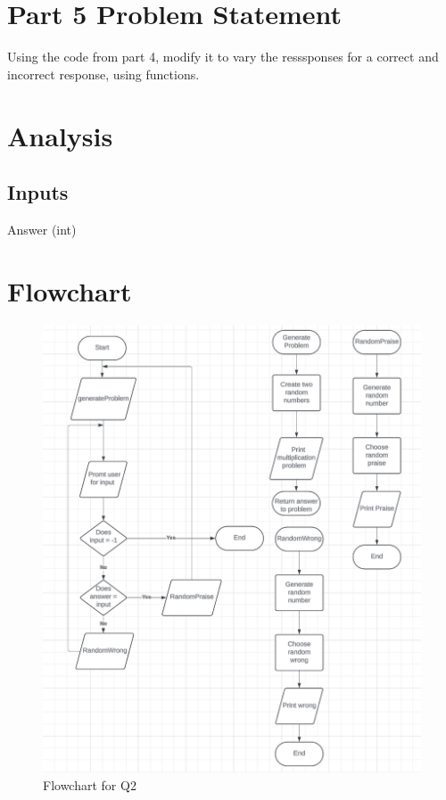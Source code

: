 \documentclass{article}
\begin{document}
\begin{flushleft}
  \section{Part 5 Problem Statement}
  Using the code from part 4, modify it to vary the resssponses for a correct and incorrect response, using functions.
  \section{Analysis}
  \subsection{Inputs}
  Answer (int)
  \section{Flowchart}
    \begin{figure}[!h]
      \begin{centering}
        \includegraphics[scale=0.5]{P5_Flowchart.png}
        \caption{Flowchart for Q2}
      \end{centering}
    \end{figure}
    \newpage

\end{flushleft}
\end{document}
